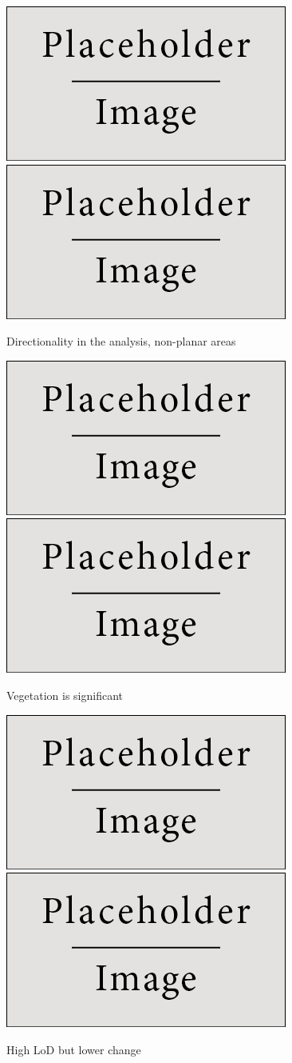 \documentclass[preprint,12pt,3p]{elsarticle}
\begin{document}
\begin{figure}
    \centering
    \includegraphics[width=0.45\linewidth]{placeholder.jpg}
    \includegraphics[width=0.45\linewidth]{placeholder.jpg}
    \caption{Directionality in the analysis, non-planar areas}
    \label{fig:example_1}
\end{figure}
\begin{figure}
    \centering
    \includegraphics[width=0.45\linewidth]{placeholder.jpg}
    \includegraphics[width=0.45\linewidth]{placeholder.jpg}
    \caption{Vegetation is significant}
    \label{fig:example_2}
\end{figure}
\begin{figure}
    \centering
    \includegraphics[width=0.45\linewidth]{placeholder.jpg}
    \includegraphics[width=0.45\linewidth]{placeholder.jpg}
    \caption{High LoD but lower change}
    \label{fig:example_3}
\end{figure}
\end{document}
